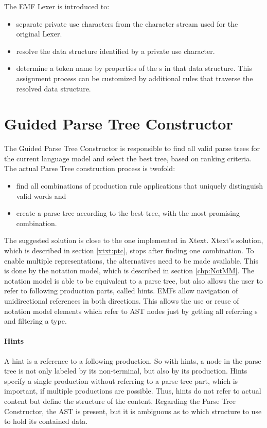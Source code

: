 The EMF Lexer is introduced to:
\begin{itemize}
	\item separate private use characters from the character stream used for the original Lexer.
	\item resolve the data structure identified by a private use character.
	\item determine a token name by properties of the s in that data structure. This assignment process can be customized by additional rules that traverse the resolved data structure.
\end{itemize}



\section{Guided Parse Tree Constructor}
The Guided Parse Tree Constructor is responsible to find all valid parse trees for the current language model and select the best tree, based on ranking criteria. The actual Parse Tree construction process is twofold:
\begin{itemize}
	\item find all combinations of production rule applications that uniquely distinguish valid words and
	\item create a parse tree according to the best tree, with the most promising combination.
\end{itemize}
 
The suggested solution is close to the one implemented in Xtext. Xtext's solution, which is described in section \ref{xtxt:ptc}, stops after finding one combination. 
To enable multiple representations, the alternatives need to be made available. This is done by the notation model, which is described in section \ref{chp:NotMM}. The notation model is able to be equivalent to a parse tree, but also allows the user to refer to following production parts, called hints. EMFs  allow navigation of unidirectional references in both directions. This allows the use or reuse of notation model elements which refer to AST nodes just by getting all referring s and filtering a type.

\paragraph{Hints}
A hint is a reference to a following production. So with hints, a node in the parse tree is not only labeled by its non-terminal, but also by its production. Hints specify a single production without referring to a parse tree part, which is important, if multiple productions are possible. Thus, hints do not refer to actual content but define the structure of the content. Regarding the Parse Tree Constructor, the AST is present, but it is ambiguous as to which structure to use to hold its contained data.  

